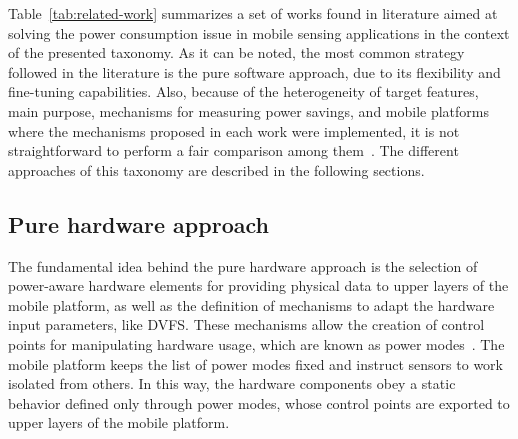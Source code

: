 \documentclass[ENG,PhD]{cinvestav}
\begin{document}

Table~\ref{tab:related-work} summarizes a set of works found in literature aimed at solving the power consumption issue in mobile sensing applications in the context of the presented taxonomy.
As it can be noted, the most common strategy followed in the literature is the pure software approach, due to its flexibility and fine-tuning capabilities.
Also, because of the heterogeneity of target features, main purpose, mechanisms for measuring power savings, and mobile platforms where the mechanisms proposed in each work were implemented, it is not straightforward to perform a fair comparison among them~\cite{Vallina-Rodriguez2013,Neely2008}.
The different approaches of this taxonomy are described in the following sections.



\subsection{Pure hardware approach}
The fundamental idea behind the pure hardware approach is the selection of power-aware hardware elements for providing physical data to upper layers of the mobile platform, as well as the definition of mechanisms to adapt the hardware input parameters, like DVFS.
These mechanisms allow the creation of control points for manipulating hardware usage, which are known as power modes~\cite{Ranganathan2010,Lorch1998,Benini2000}.
The mobile platform keeps the list of power modes fixed and instruct sensors to work isolated from others.
In this way, the hardware components obey a static behavior defined only through power modes, whose control points are exported to upper layers of the mobile platform.
\end{document}
